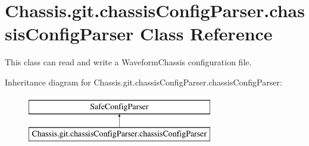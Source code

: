 \hypertarget{class_chassis_8git_1_1chassis_config_parser_1_1chassis_config_parser}{\section{Chassis.\-git.\-chassis\-Config\-Parser.\-chassis\-Config\-Parser Class Reference}
\label{class_chassis_8git_1_1chassis_config_parser_1_1chassis_config_parser}
}


This class can read and write a Waveform\-Chassis configuration file.  


Inheritance diagram for Chassis.\-git.\-chassis\-Config\-Parser.\-chassis\-Config\-Parser\-:\begin{figure}[H]
\begin{center}
\leavevmode
\includegraphics[height=2.000000cm]{class_chassis_8git_1_1chassis_config_parser_1_1chassis_config_parser}
\end{center}
\end{figure}

